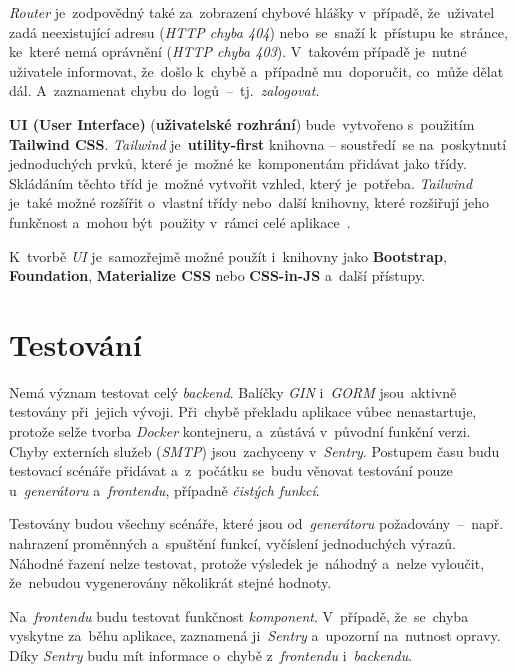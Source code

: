 \documentclass[11pt,a4paper]{report}
\begin{document}
            \emph{Router} je~zodpovědný také za~zobrazení chybové hlášky v~případě, že~uživatel zadá neexistující adresu (\emph{HTTP chyba 404}) nebo~se~snaží k~přístupu ke~stránce, ke~které nemá oprávnění (\emph{HTTP chyba 403}). V~takovém případě je~nutné uživatele informovat, že~došlo k~chybě a~případně mu~doporučit, co~může dělat dál. A~zaznamenat chybu do~logů~--~tj.~\emph{zalogovat}.
            
            \textbf{UI (User Interface)} (\textbf{uživatelské rozhrání}) bude~vytvořeno s~použitím \textbf{Tailwind CSS}. \emph{Tailwind} je~\textbf{utility-first} knihovna -- soustředí~se na~poskytnutí jednoduchých prvků, které je~možné ke~komponentám přidávat jako třídy. Skládáním těchto tříd je~možné vytvořit vzhled, který je~potřeba. \emph{Tailwind} je~také možné rozšířit o~vlastní třídy nebo~další knihovny, které rozšiřují jeho funkčnost a~mohou být~použity v~rámci celé aplikace~\cite{Rappin2022ModernCSSTailwind}.

            K~tvorbě \emph{UI} je~samozřejmě možné použít i~knihovny jako \textbf{Bootstrap}, \textbf{Foundation}, \textbf{Materialize CSS} nebo \textbf{CSS-in-JS} a~další přístupy.

        \section{Testování}
            Nemá význam testovat celý \emph{backend}. Balíčky \emph{GIN} i~\emph{GORM} jsou~aktivně testovány při~jejich vývoji. Při~chybě překladu aplikace vůbec nenastartuje, protože selže tvorba \emph{Docker} kontejneru, a~zůstává v~původní funkční verzi. Chyby externích služeb (\emph{SMTP}) jsou~zachyceny v~\emph{Sentry}. Postupem času budu testovací scénáře přidávat a~z~počátku se~budu věnovat testování pouze u~\emph{generátoru} a~\emph{frontendu}, případně \emph{čistých funkcí}.

            Testovány budou všechny scénáře, které jsou od~\emph{generátoru} požadovány~--~např. nahrazení proměnných a~spuštění funkcí, vyčíslení jednoduchých výrazů. Náhodné řazení nelze testovat, protože výsledek je~náhodný a~nelze vyloučit, že~nebudou vygenerovány několikrát stejné hodnoty.

            Na~\emph{frontendu} budu testovat funkčnost \emph{komponent}. V~případě, že~se~chyba vyskytne za~běhu aplikace, zaznamená ji~\emph{Sentry} a~upozorní na~nutnost opravy. Díky \emph{Sentry} budu mít informace o~chybě z~\emph{frontendu} i~\emph{backendu}.
        
\end{document}
